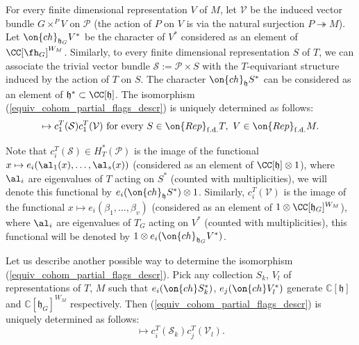 \documentclass[12pt]{amsart}
\begin{document}
For every finite dimensional representation $V$ of $M$, let $\mathcal{V}$ be the induced vector bundle $G \times^P V$ on $\mathcal{P}$ (the action of $P$ on $V$ is via the natural surjection $P \twoheadrightarrow M$). 
Let $\on{ch}_{\mathfrak{h}_G}V^*$ be the character of $V^*$ considered as an element of $\CC[\fh_G]^{W_M}$. Similarly, to every finite dimensional representation $S$ of $T$, we can associate the trivial vector bundle  $\mathcal{S}:=\mathcal{P} \times S$ with the $T$-equivariant structure induced by the action of $T$ on $S$. The character $\on{ch}_{\mathfrak{h}}S^*$ can be considered as an element of $\mathfrak{h}^* \subset \CC[\mathfrak{h}]$. The isomorphism (\ref{equiv_cohom_partial_flags_descr}) is uniquely determined as follows:
\begin{equation*}
[\on{ch}_{\mathfrak{h}}S^* \otimes \on{ch}_{\mathfrak{h}_G}V^*] \mapsto c_1^T(\mathcal{S})c^T_1(\mathcal{V})~\text{for every}~S \in \on{Rep}_{\mathrm{f.d.}}T,~V \in \on{Rep}_{\mathrm{f.d.}}M.
\end{equation*}



Note that $c_i^T(\mathcal{S}) \in H^*_T(\mathcal{P})$ is the image of the functional $x \mapsto e_i(\al_1(x),\ldots,\al_s(x))$ (considered as an element of $\CC[\mathfrak{h}] \otimes 1$), where $\al_i$ are eigenvalues of $T$ acting on $S^*$ (counted with multiplicities), we will denote this functional by $e_i(\on{ch}_{\mathfrak{h}}S^*) \otimes 1$. Similarly, $c_i^T(\mathcal{V})$ is the image of the functional $x \mapsto e_i(\beta_1,\ldots,\beta_{v})$ (considered as an element of $1 \otimes  \CC[\mathfrak{h}_{G}]^{W_M}$), where  $\al_i$ are eigenvalues of $T_G$ acting on $V^*$ (counted with multiplicities), this functional will be denoted by $1 \otimes e_i(\on{ch}_{\mathfrak{h}_G}V^*)$.

Let us describe another possible way to determine the isomorphism (\ref{equiv_cohom_partial_flags_descr}). Pick any  
collection $S_k$, $V_l$ of representations of  $T$, $M$  such that $e_i(\on{ch}S_k^*)$, $e_j(\on{ch}V_l^*)$ generate $\mathbb{C}[\mathfrak{h}]$ and $\mathbb{C}[\mathfrak{h}_G]^{W_M}$ respectively.
Then (\ref{equiv_cohom_partial_flags_descr}) is uniquely determined as follows:
\begin{equation*}
[e_i(\on{ch}_{\mathfrak{h}}S_k^*) \otimes e_j(\on{ch}_{\mathfrak{h}_G}V_l^*)] \mapsto c_i^T(\mathcal{S}_k)c_j^T(\mathcal{V}_l).
\end{equation*}
\end{document}
